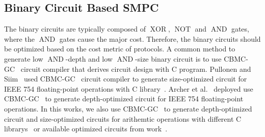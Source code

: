 \subsection{Binary Circuit Based SMPC}
\label{subsec:BinaryCircuitBasedSMPC}

The binary circuits are typically composed of $\operatorname{XOR}$, $\operatorname{NOT}$ and $\operatorname{AND}$ gates, where the $\operatorname{AND}$ gates cause the major cost. Therefore, the binary circuits should be optimized based on the cost metric of \smpc protocols. A common method to generate low $\operatorname{AND}$-depth and low $\operatorname{AND}$-size binary circuit is to use CBMC-GC~\cite{buscher2016compiling} circuit compiler that derives circuit design with C program. Pullonen and Siim~\cite{pullonen2015combining} used CBMC-GC~\cite{buscher2016compiling} circuit compiler to generate size-optimized circuit for IEEE 754 floating-point operations with C library~\cite{BerkelySoftFloat,musllibc}. Archer et al.~\cite{archer2021cost} deployed use CBMC-GC~\cite{buscher2016compiling} to generate depth-optimized circuit for IEEE 754 floating-point operations. In this works, we also use CBMC-GC~\cite{archer2021cost} to generate depth-optimized circuit and size-optimized circuits for arithemtic operations with different C librarys~\cite{BerkelySoftFloat,musllibc} or available optimized circuits from work~\cite{demmler2015aby}.









